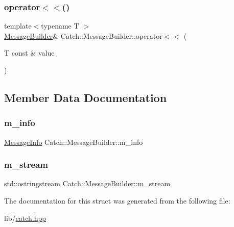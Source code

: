 \subsubsection{\texorpdfstring{operator$<$$<$()}{operator<<()}}
{\footnotesize\ttfamily template$<$typename T $>$ \\
\hyperlink{struct_catch_1_1_message_builder}{Message\+Builder}\& Catch\+::\+Message\+Builder\+::operator$<$$<$ (\begin{DoxyParamCaption}\item[{T const \&}]{value }\end{DoxyParamCaption})\hspace{0.3cm}{\ttfamily [inline]}}



\subsection{Member Data Documentation}
\hypertarget{struct_catch_1_1_message_builder_a979f1c2b36d78f80ee275bfa5ba0209f}{}\label{struct_catch_1_1_message_builder_a979f1c2b36d78f80ee275bfa5ba0209f} 
\subsubsection{\texorpdfstring{m\+\_\+info}{m\_info}}
{\footnotesize\ttfamily \hyperlink{struct_catch_1_1_message_info}{Message\+Info} Catch\+::\+Message\+Builder\+::m\+\_\+info}

\hypertarget{struct_catch_1_1_message_builder_a6488ab0cc4ea52affc9c0612c7c5df6b}{}\label{struct_catch_1_1_message_builder_a6488ab0cc4ea52affc9c0612c7c5df6b} 
\subsubsection{\texorpdfstring{m\+\_\+stream}{m\_stream}}
{\footnotesize\ttfamily std\+::ostringstream Catch\+::\+Message\+Builder\+::m\+\_\+stream}



The documentation for this struct was generated from the following file\+:\begin{DoxyCompactItemize}
\item 
lib/\hyperlink{catch_8hpp}{catch.\+hpp}\end{DoxyCompactItemize}
